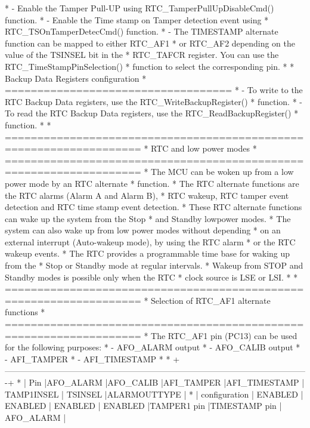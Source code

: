 \begin{DoxyVerb}
*            - Enable the Tamper Pull-UP using RTC_TamperPullUpDisableCmd() function.
*            - Enable the Time stamp on Tamper detection event using  
*              RTC_TSOnTamperDetecCmd() function.
*            - The TIMESTAMP alternate function can be mapped to either RTC_AF1 
*              or RTC_AF2 depending on the value of the TSINSEL bit in the 
*              RTC_TAFCR register. You can use the  RTC_TimeStampPinSelection()
*              function to select the corresponding pin. 
*
*          Backup Data Registers configuration
*          ===================================
*            - To write to the RTC Backup Data registers, use the RTC_WriteBackupRegister()
*              function.  
*            - To read the RTC Backup Data registers, use the RTC_ReadBackupRegister()
*              function.
* 
*          ===================================================================
*                                  RTC and low power modes
*          ===================================================================
*           The MCU can be woken up from a low power mode by an RTC alternate 
*           function.
*           The RTC alternate functions are the RTC alarms (Alarm A and Alarm B), 
*           RTC wakeup, RTC tamper event detection and RTC time stamp event detection.
*           These RTC alternate functions can wake up the system from the Stop 
*           and Standby lowpower modes.
*           The system can also wake up from low power modes without depending 
*           on an external interrupt (Auto-wakeup mode), by using the RTC alarm 
*           or the RTC wakeup events.
*           The RTC provides a programmable time base for waking up from the 
*           Stop or Standby mode at regular intervals.
*           Wakeup from STOP and Standby modes is possible only when the RTC 
*           clock source is LSE or LSI.
*
*          ===================================================================
*                            Selection of RTC_AF1 alternate functions
*          ===================================================================
*          The RTC_AF1 pin (PC13) can be used for the following purposes:
*            - AFO_ALARM output
*            - AFO_CALIB output
*            - AFI_TAMPER
*            - AFI_TIMESTAMP
*
* +-------------------------------------------------------------------------------------------------------------+
* |     Pin         |AFO_ALARM |AFO_CALIB |AFI_TAMPER |AFI_TIMESTAMP | TAMP1INSEL |   TSINSEL    |ALARMOUTTYPE  |
* |  configuration  | ENABLED  | ENABLED  |  ENABLED  |   ENABLED    |TAMPER1 pin |TIMESTAMP pin |  AFO_ALARM   |

\end{DoxyVerb}
